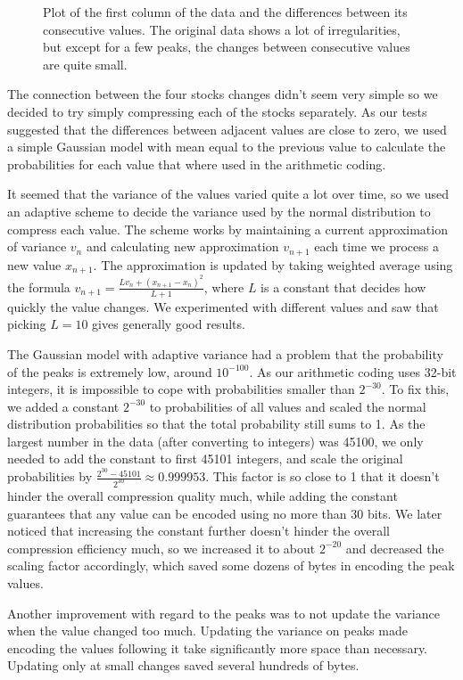 \documentclass{article}
\begin{document}
\begin{figure}
	\caption{Plot of the first column of the data and the differences between its consecutive values. The original data shows a lot of irregularities, but except for a few peaks, the changes between consecutive values are quite small.}
\end{figure}

The connection between the four stocks changes didn't seem very simple so we decided to try simply compressing each of the stocks separately.
As our tests suggested that the differences between adjacent values are close to zero, we used a simple Gaussian model with mean equal to the previous value to calculate the probabilities for each value that where used in the arithmetic coding.

It seemed that the variance of the values varied quite a lot over time, so we used an adaptive scheme to decide the variance used by the normal distribution to compress each value.
The scheme works by maintaining a current approximation of variance $v_n$ and calculating new approximation $v_{n+1}$ each time we process a new value $x_{n+1}$.
The approximation is updated by taking weighted average using the formula $v_{n+1} = \frac{Lv_n + (x_{n+1}-x_n)^2}{L+1}$, where $L$ is a constant that decides how quickly the value changes.
We experimented with different values and saw that picking $L=10$ gives generally good results.

The Gaussian model with adaptive variance had a problem that the probability of the peaks is extremely low, around $10^{-100}$.
As our arithmetic coding uses 32-bit integers, it is impossible to cope with probabilities smaller than $2^{-30}$.
To fix this, we added a constant $2^{-30}$ to probabilities of all values and scaled the normal distribution probabilities so that the total probability still sums to 1.
As the largest number in the data (after converting to integers) was 45100, we only needed to add the constant to first 45101 integers, and scale the original probabilities by $\frac{2^{30}-45101}{2^{30}} \approx 0.999953$.
This factor is so close to 1 that it doesn't hinder the overall compression quality much, while adding the constant guarantees that any value can be encoded using no more than 30 bits.
We later noticed that increasing the constant further doesn't hinder the overall compression efficiency much, so we increased it to about $2^{-20}$ and decreased the scaling factor accordingly, which saved some dozens of bytes in encoding the peak values.

Another improvement with regard to the peaks was to not update the variance when the value changed too much.
Updating the variance on peaks made encoding the values following it take significantly more space than necessary.
Updating only at small changes saved several hundreds of bytes.
\end{document}
